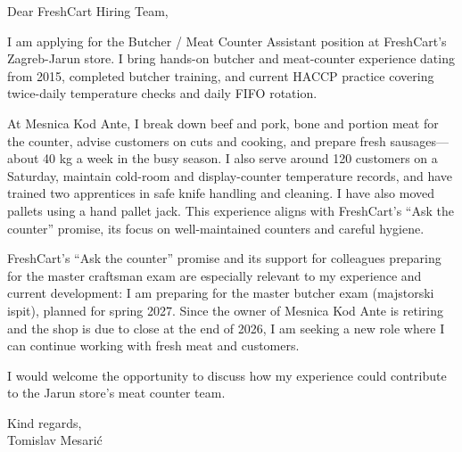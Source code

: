 \documentclass[11pt,a4paper]{article}
\begin{document}
Dear FreshCart Hiring Team,

I am applying for the Butcher / Meat Counter Assistant position at FreshCart’s Zagreb-Jarun store. I bring hands-on butcher and meat-counter experience dating from 2015, completed butcher training, and current HACCP practice covering twice-daily temperature checks and daily FIFO rotation.

At Mesnica Kod Ante, I break down beef and pork, bone and portion meat for the counter, advise customers on cuts and cooking, and prepare fresh sausages—about 40 kg a week in the busy season. I also serve around 120 customers on a Saturday, maintain cold-room and display-counter temperature records, and have trained two apprentices in safe knife handling and cleaning. I have also moved pallets using a hand pallet jack. This experience aligns with FreshCart’s “Ask the counter” promise, its focus on well-maintained counters and careful hygiene.

FreshCart’s “Ask the counter” promise and its support for colleagues preparing for the master craftsman exam are especially relevant to my experience and current development: I am preparing for the master butcher exam (majstorski ispit), planned for spring 2027. Since the owner of Mesnica Kod Ante is retiring and the shop is due to close at the end of 2026, I am seeking a new role where I can continue working with fresh meat and customers.

I would welcome the opportunity to discuss how my experience could contribute to the Jarun store’s meat counter team.

Kind regards,\\
Tomislav Mesarić
\end{document}
